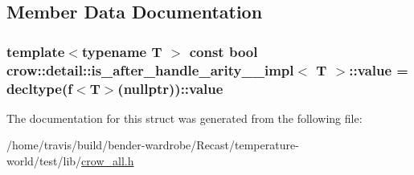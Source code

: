\subsection{Member Data Documentation}
\hypertarget{structcrow_1_1detail_1_1is__after__handle__arity__3__impl_aadf841ce8204506e16e38102f7584ff6}{
\subsubsection[{value}]{\setlength{\rightskip}{0pt plus 5cm}template$<$typename T $>$ const bool {\bf crow\-::detail\-::is\-\_\-after\-\_\-handle\-\_\-arity\-\_\-\_\-impl}$<$ T $>$\-::value = decltype({\bf f}$<$T$>$(nullptr))\-::value\hspace{0.3cm}{\ttfamily [static]}}}\label{structcrow_1_1detail_1_1is__after__handle__arity__3__impl_aadf841ce8204506e16e38102f7584ff6}


The documentation for this struct was generated from the following file\-:\begin{DoxyCompactItemize}
\item 
/home/travis/build/bender-\/wardrobe/\-Recast/temperature-\/world/test/lib/\hyperlink{crow__all_8h}{crow\-\_\-all.\-h}\end{DoxyCompactItemize}

